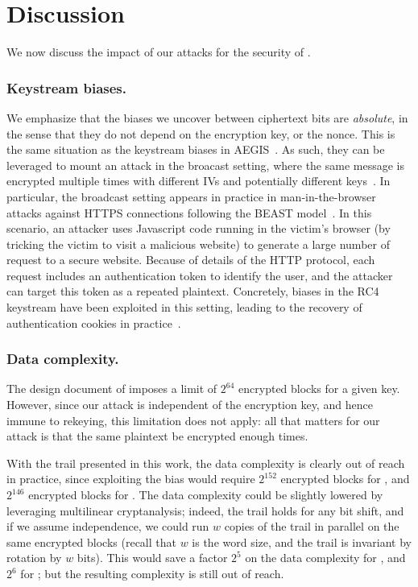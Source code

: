 
\section{Discussion}
\label{sec/Discussion}


We now discuss the impact of our attacks for the security of \morus.

\subsubsection{Keystream biases.}

We emphasize that the biases we uncover between ciphertext bits are
\emph{absolute}, in the sense that they do not depend on the encryption
key, or the nonce.  This is the same situation as the keystream biases
in AEGIS~\cite{sacryptMinaud14}.  As such, they can be leveraged to
mount an attack in the broacast setting, where the same message is
encrypted multiple times with different IVs and potentially different
keys~\cite{DBLP:conf/fse/MantinS01}.  In particular, the broadcast setting appears
in practice in man-in-the-browser attacks against HTTPS connections
following the BEAST model~\cite{duong2011here}.  In this scenario, an
attacker uses Javascript code running in the victim's browser (by
tricking the victim to visit a malicious website) to generate a large
number of request to a secure website.  Because of details of the HTTP
protocol, each request includes an authentication token to identify the
user, and the attacker can target this token as a repeated plaintext.
Concretely, biases in the RC4 keystream have been exploited in this
setting, leading to the recovery of authentication cookies in
practice~\cite{DBLP:conf/uss/AlFardanBPPS13}.

\subsubsection{Data complexity.}

The design document of  imposes a limit of $2^{64}$
encrypted blocks for a given key. However, since our attack is
independent of the encryption key, and hence immune to rekeying, this
limitation does not apply: all that matters for our attack is that the
same plaintext be encrypted enough times.

With the trail presented in this work, the data complexity is clearly
out of reach in practice, since exploiting the bias would require
$2^{152}$ encrypted blocks for , and $2^{146}$
encrypted blocks for . The data complexity could be
slightly lowered by leveraging multilinear cryptanalysis; indeed, the
trail holds for any bit shift, and if we assume independence, we could
run $w$ copies of the trail in parallel on the same encrypted blocks
(recall that $w$ is the word size, and the trail is invariant by
rotation by $w$ bits). This would save a factor $2^5$ on the data
complexity for , and $2^6$ for ; but
the resulting complexity is still out of reach.

